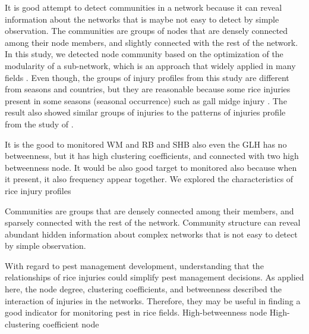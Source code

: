 It is good attempt to detect communities in a network because it can reveal information about the networks that is maybe not easy to detect by simple observation. The communities are groups of nodes that are densely connected among their node members, and slightly connected with the rest of the network.  In this study, we detected node community based on the optimization of the modularity of a sub-network, which is an approach that widely applied in many fields \cite{Liu_2014_Detecting}. Even though, the groups of injury profiles from this study are different from seasons and countries, but they are reasonable because some rice injuries present in some seasons (seasonal occurrence) such as gall midge injury \cite{Krishnaiah_2004_Rice}. The result also showed similar groups of injuries to the patterns of injuries profile from the study of \cite{Savary_2000_Characterization}. 


It is the good to monitored WM and RB  and SHB also even the GLH has no betweenness, but it has high clustering coefficients, and connected with two high betweenness node. It would be also good target to monitored also because when it present, it also frequency appear together.
We explored the characteristics of rice injury profiles

Communities are groups that are densely connected among their members, and sparsely connected with the rest of the network. Community structure can reveal abundant hidden information about complex networks that is not easy to detect by simple observation. 

With regard to pest management development, understanding that the relationships of rice injuries could simplify pest management decisions. As applied here, the node degree, clustering coefficients, and betweenness described the interaction of injuries in the networks. Therefore, they may be useful in finding a good indicator for monitoring pest in rice fields. High-betweenness node High- clustering coefficient node 

